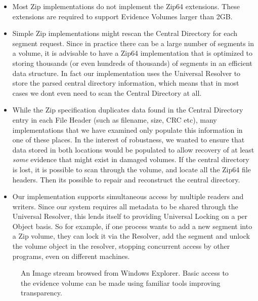 \documentclass[10pt, conference]{IEEEtran}
\begin{document}
\begin{itemize}
\item Most Zip implementations do not implement the Zip64
  extensions. These extensions are required to support Evidence
  Volumes larger than 2GB.

\item Simple Zip implementations might rescan the
  Central Directory for each segment request. Since in practice there
  can be a large number of segments in a volume, it is advisable to
  have a Zip64 implementation that is optimized to storing thousands
  (or even hundreds of thousands) of segments in an efficient data
  structure. In fact our implementation uses the Universal Resolver to
  store the parsed central directory information, which means that in
  most cases we dont even need to scan the Central Directory at all.

\item While the Zip specification duplicates data found in the Central
  Directory entry in each File Header (such as filename, size, CRC
  etc), many implementations that we have examined only populate this
  information in one of these places. In the interest of robustness,
  we wanted to ensure that data stored in both locations would be
  populated to allow recovery of at least \emph{some} evidence that
  might exist in damaged volumes. If the central directory is lost, it
  is possible to scan through the volume, and locate all the Zip64
  file headers. Then its possible to repair and reconstruct the
  central directory.

\item Our implementation supports simultaneous access by multiple
  readers and writers. Since our system requires all metadata to be
  shared through the Universal Resolver, this lends itself to
  providing Universal Locking on a per Object basis. So for example,
  if one process wants to add a new segment into a Zip volume, they
  can lock it via the Resolver, add the segment and unlock the volume
  object in the resolver, stopping concurrent access by other
  programs, even on different machines.
\end{itemize}

\begin{figure}[tbp]
  \begin{center}
  \mbox{\columnwidth {}}

  \caption{An Image stream browsed from Windows Explorer.  Basic
  access to the evidence volume can be made using familiar tools
  improving transparency.}

  \label{explorer}
  \end{center}
\end{figure}
\end{document}
